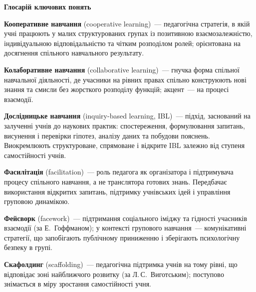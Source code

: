 \documentclass[a4paper,14pt]{extarticle}
\begin{document}
\vspace{1em}
\begin{center}
\textbf{Глосарій ключових понять}
\end{center}

\textbf{Кооперативне навчання} (cooperative learning)~--- педагогічна стратегія, в якій учні працюють у малих структурованих групах із позитивною взаємозалежністю, індивідуальною відповідальністю та чітким розподілом ролей; орієнтована на досягнення спільного навчального результату.

\textbf{Колаборативне навчання} (collaborative learning)~--- гнучка форма спільної навчальної діяльності, де учасники на рівних правах спільно конструюють нові знання та смисли без жорсткого розподілу функцій; акцент~--- на процесі взаємодії.

\textbf{Дослідницьке навчання} (inquiry-based learning, IBL)~--- підхід, заснований на залученні учнів до наукових практик: спостереження, формулювання запитань, висунення і перевірки гіпотез, аналізу даних та побудови пояснень. Виокремлюють структуроване, спрямоване і відкрите IBL залежно від ступеня самостійності учнів.

\textbf{Фасилітація} (facilitation)~--- роль педагога як організатора і підтримувача процесу спільного навчання, а не транслятора готових знань. Передбачає використання відкритих запитань, підтримку учнівських ідей і управління груповою динамікою.

\textbf{Фейсворк} (facework)~--- підтримання соціального іміджу та гідності учасників взаємодії (за Е.~Гоффманом); у контексті групового навчання~--- комунікативні стратегії, що запобігають публічному приниженню і зберігають психологічну безпеку в групі.

\textbf{Скафолдинг} (scaffolding)~--- педагогічна підтримка учнів на тому рівні, що відповідає зоні найближчого розвитку (за Л.\,С.~Виготським); поступово знімається в міру зростання самостійності учня.
\end{document}
